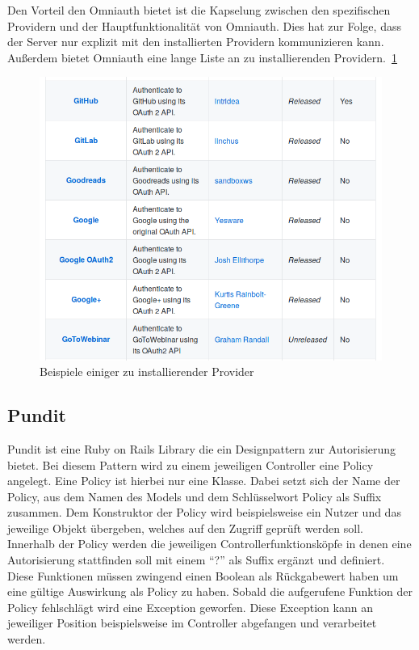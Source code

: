 \documentclass[paper=a4,fontsize=12pt,parskip=half]{scrartcl}
\begin{document}
	Den Vorteil den Omniauth bietet ist die Kapselung zwischen den spezifischen Providern und der Hauptfunktionalität von Omniauth. Dies hat zur Folge, dass der Server nur explizit mit den installierten Providern kommunizieren kann. Außerdem bietet Omniauth eine lange Liste an zu installierenden Providern.~\ref{fig:provider-list}
	
	\begin{figure}[h]
		\includegraphics[width=\textwidth]{images/provider-list.png}
		\caption{Beispiele einiger zu installierender Provider}
		\label{fig:provider-list}
	\end{figure}

	\subsection{Pundit}
	\label{sec: pundit}
	Pundit ist eine Ruby on Rails Library die ein Designpattern zur Autorisierung bietet. Bei diesem Pattern wird zu einem jeweiligen Controller eine Policy angelegt. Eine Policy ist hierbei nur eine Klasse. Dabei setzt sich der Name der Policy, aus dem Namen des Models und dem Schlüsselwort Policy als Suffix zusammen. Dem Konstruktor der Policy wird beispielsweise ein Nutzer und das jeweilige Objekt übergeben, welches auf den Zugriff geprüft werden soll. Innerhalb der Policy werden die jeweiligen Controllerfunktionsköpfe in denen eine Autorisierung stattfinden soll mit einem \enquote{?} als Suffix ergänzt und definiert. Diese Funktionen müssen zwingend einen Boolean als Rückgabewert haben um eine gültige Auswirkung als Policy zu haben. Sobald die aufgerufene Funktion der Policy fehlschlägt wird eine Exception geworfen. Diese Exception kann an jeweiliger Position beispielsweise im Controller abgefangen und verarbeitet werden. 
	
\end{document}
